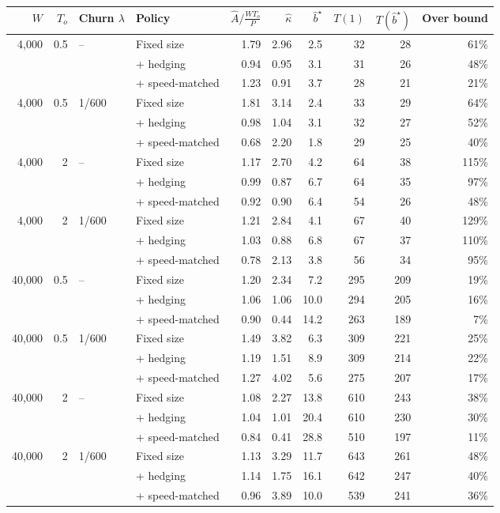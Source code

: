 \begin{tabular}{@{}rrllrrrrrr@{}}
\toprule
$W$ & $T_o$ & \textbf{Churn} $\lambda$ & \textbf{Policy} & $\hat A/\tfrac{W T_o}{P}$ & $\hat\kappa$ & $\hat b^\star$ & $T(1)$ & $T(\hat b^\star)$ & \textbf{Over bound} \\
\midrule
4{,}000 & 0.5 & -- & Fixed size & 1.79 & 2.96 & 2.5 & 32 & 28 & 61\% \\
 &  &  & + hedging & 0.94 & 0.95 & 3.1 & 31 & 26 & 48\% \\
 &  &  & + speed-matched & 1.23 & 0.91 & 3.7 & 28 & 21 & 21\% \\
\midrule
4{,}000 & 0.5 & 1/600 & Fixed size & 1.81 & 3.14 & 2.4 & 33 & 29 & 64\% \\
 &  &  & + hedging & 0.98 & 1.04 & 3.1 & 32 & 27 & 52\% \\
 &  &  & + speed-matched & 0.68 & 2.20 & 1.8 & 29 & 25 & 40\% \\
\midrule
4{,}000 & 2 & -- & Fixed size & 1.17 & 2.70 & 4.2 & 64 & 38 & 115\% \\
 &  &  & + hedging & 0.99 & 0.87 & 6.7 & 64 & 35 & 97\% \\
 &  &  & + speed-matched & 0.92 & 0.90 & 6.4 & 54 & 26 & 48\% \\
\midrule
4{,}000 & 2 & 1/600 & Fixed size & 1.21 & 2.84 & 4.1 & 67 & 40 & 129\% \\
 &  &  & + hedging & 1.03 & 0.88 & 6.8 & 67 & 37 & 110\% \\
 &  &  & + speed-matched & 0.78 & 2.13 & 3.8 & 56 & 34 & 95\% \\
\midrule
40{,}000 & 0.5 & -- & Fixed size & 1.20 & 2.34 & 7.2 & 295 & 209 & 19\% \\
 &  &  & + hedging & 1.06 & 1.06 & 10.0 & 294 & 205 & 16\% \\
 &  &  & + speed-matched & 0.90 & 0.44 & 14.2 & 263 & 189 & 7\% \\
\midrule
40{,}000 & 0.5 & 1/600 & Fixed size & 1.49 & 3.82 & 6.3 & 309 & 221 & 25\% \\
 &  &  & + hedging & 1.19 & 1.51 & 8.9 & 309 & 214 & 22\% \\
 &  &  & + speed-matched & 1.27 & 4.02 & 5.6 & 275 & 207 & 17\% \\
\midrule
40{,}000 & 2 & -- & Fixed size & 1.08 & 2.27 & 13.8 & 610 & 243 & 38\% \\
 &  &  & + hedging & 1.04 & 1.01 & 20.4 & 610 & 230 & 30\% \\
 &  &  & + speed-matched & 0.84 & 0.41 & 28.8 & 510 & 197 & 11\% \\
\midrule
40{,}000 & 2 & 1/600 & Fixed size & 1.13 & 3.29 & 11.7 & 643 & 261 & 48\% \\
 &  &  & + hedging & 1.14 & 1.75 & 16.1 & 642 & 247 & 40\% \\
 &  &  & + speed-matched & 0.96 & 3.89 & 10.0 & 539 & 241 & 36\% \\
\bottomrule
\end{tabular}
